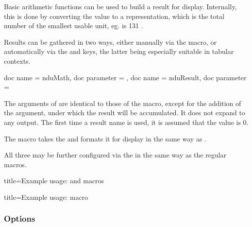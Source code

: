 \documentclass{article}
\begin{document}
Basic arithmetic functions can be used to build a result for display. Internally, this is done by converting the value to a representation, which is the total number of the smallest usable unit, eg.  is 131 .

Results can be gathered in two ways, either manually via the  macro, or automatically via the  and  keys, the latter being especially suitable in tabular contexts.

\begin{docCommands}[]{
	{
		doc name = nduMath,
		doc parameter = 
	},
	{
		doc name = nduResult,
		doc parameter = 
	}
}

The arguments of  are identical to those of the  macro, except for the addition of the  argument, under which the result will be accumulated. It does not expand to any output. The first time a result name is used, it is assumed that the value is 0.

The  macro takes the  and formats it for display in the same way as .

All three may be further configured via the  in the same way as the regular macros.

\begin{dispExample*}{
	title=Example usage:  and  macros
}
\end{dispExample*}

\begin{dispExample*}{
	title=Example usage:  macro
}
\\
\end{dispExample*}
\end{docCommands}

\clearpage
\subsubsection{Options}
\end{document}
